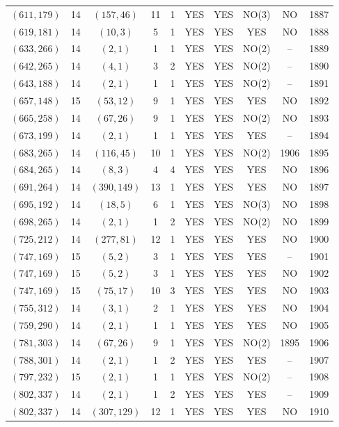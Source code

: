 \begin{longtable}{|c|c|c|c|c|c|c|c|c|c|}
$(611, 179)$ & 14 & $(157, 46)$ & 11 & 1 & YES & YES & NO(3) & NO & 1887\\
$(619, 181)$ & 14 & $(10, 3)$ & 5 & 1 & YES & YES & YES & NO & 1888\\
$(633, 266)$ & 14 & $(2, 1)$ & 1 & 1 & YES & YES & NO(2) & -- & 1889\\
$(642, 265)$ & 14 & $(4, 1)$ & 3 & 2 & YES & YES & NO(2) & -- & 1890\\
$(643, 188)$ & 14 & $(2, 1)$ & 1 & 1 & YES & YES & NO(2) & -- & 1891\\
$(657, 148)$ & 15 & $(53, 12)$ & 9 & 1 & YES & YES & YES & NO & 1892\\
$(665, 258)$ & 14 & $(67, 26)$ & 9 & 1 & YES & YES & NO(2) & NO & 1893\\
$(673, 199)$ & 14 & $(2, 1)$ & 1 & 1 & YES & YES & YES & -- & 1894\\
$(683, 265)$ & 14 & $(116, 45)$ & 10 & 1 & YES & YES & NO(2) & 1906 & 1895\\
$(684, 265)$ & 14 & $(8, 3)$ & 4 & 4 & YES & YES & YES & NO & 1896\\
$(691, 264)$ & 14 & $(390, 149)$ & 13 & 1 & YES & YES & YES & NO & 1897\\
$(695, 192)$ & 14 & $(18, 5)$ & 6 & 1 & YES & YES & NO(3) & NO & 1898\\
$(698, 265)$ & 14 & $(2, 1)$ & 1 & 2 & YES & YES & NO(2) & NO & 1899\\
$(725, 212)$ & 14 & $(277, 81)$ & 12 & 1 & YES & YES & YES & NO & 1900\\
$(747, 169)$ & 15 & $(5, 2)$ & 3 & 1 & YES & YES & YES & -- & 1901\\
$(747, 169)$ & 15 & $(5, 2)$ & 3 & 1 & YES & YES & YES & NO & 1902\\
$(747, 169)$ & 15 & $(75, 17)$ & 10 & 3 & YES & YES & YES & NO & 1903\\
$(755, 312)$ & 14 & $(3, 1)$ & 2 & 1 & YES & YES & YES & NO & 1904\\
$(759, 290)$ & 14 & $(2, 1)$ & 1 & 1 & YES & YES & YES & NO & 1905\\
$(781, 303)$ & 14 & $(67, 26)$ & 9 & 1 & YES & YES & NO(2) & 1895 & 1906\\
$(788, 301)$ & 14 & $(2, 1)$ & 1 & 2 & YES & YES & YES & -- & 1907\\
$(797, 232)$ & 15 & $(2, 1)$ & 1 & 1 & YES & YES & NO(2) & -- & 1908\\
$(802, 337)$ & 14 & $(2, 1)$ & 1 & 2 & YES & YES & YES & -- & 1909\\
$(802, 337)$ & 14 & $(307, 129)$ & 12 & 1 & YES & YES & YES & NO & 1910\\

\end{longtable}
